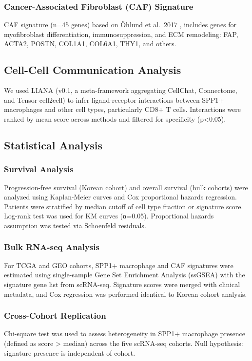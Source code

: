 \documentclass[12pt,twoside]{article}
\begin{document}
\subsubsection{Cancer-Associated Fibroblast (CAF) Signature}
CAF signature (n=45 genes) based on Öhlund et al.\ 2017 \cite{Ohlund2017}, includes genes for myofibroblast differentiation, immunosuppression, and ECM remodeling: FAP, ACTA2, POSTN, COL1A1, COL6A1, THY1, and others.

\subsection{Cell-Cell Communication Analysis}

We used LIANA (v0.1, a meta-framework aggregating CellChat, Connectome, and Tensor-cell2cell) to infer ligand-receptor interactions between SPP1+ macrophages and other cell types, particularly CD8+ T cells. Interactions were ranked by mean score across methods and filtered for specificity (p<0.05).

\subsection{Statistical Analysis}

\subsubsection{Survival Analysis}
Progression-free survival (Korean cohort) and overall survival (bulk cohorts) were analyzed using Kaplan-Meier curves and Cox proportional hazards regression. Patients were stratified by median cutoff of cell type fraction or signature score. Log-rank test was used for KM curves (α=0.05). Proportional hazards assumption was tested via Schoenfeld residuals.

\subsubsection{Bulk RNA-seq Analysis}
For TCGA and GEO cohorts, SPP1+ macrophage and CAF signatures were estimated using single-sample Gene Set Enrichment Analysis (ssGSEA) with the signature gene list from scRNA-seq. Signature scores were merged with clinical metadata, and Cox regression was performed identical to Korean cohort analysis.

\subsubsection{Cross-Cohort Replication}
Chi-square test was used to assess heterogeneity in SPP1+ macrophage presence (defined as score > median) across the five scRNA-seq cohorts. Null hypothesis: signature presence is independent of cohort.
\end{document}

